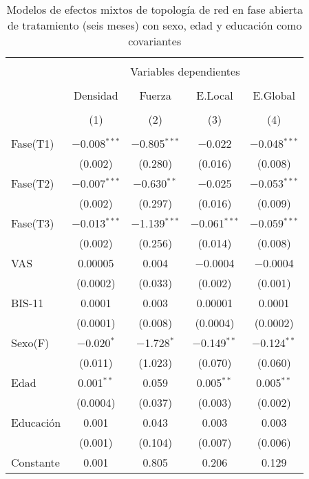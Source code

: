 \begin{table}[!htbp] \centering
    \small
  \caption{Modelos de efectos mixtos de topología de red en fase abierta de tratamiento (seis meses) con sexo, edad y educación como covariantes}
  \label{tab:memL2}
\begin{tabular}{@{\extracolsep{5pt}}lcccc}
\\[-1.8ex]\hline
\hline \\[-1.8ex]
 & \multicolumn{4}{c}{Variables dependientes} \\
\cline{2-5}
\\[-1.8ex] & Densidad & Fuerza & E.Local & E.Global \\
\\[-1.8ex] & (1) & (2) & (3) & (4)\\
\hline \\[-1.8ex]
 Fase(T1) & $-$0.008$^{***}$ & $-$0.805$^{***}$ & $-$0.022 & $-$0.048$^{***}$ \\
  & (0.002) & (0.280) & (0.016) & (0.008) \\
  Fase(T2) & $-$0.007$^{***}$ & $-$0.630$^{**}$ & $-$0.025 & $-$0.053$^{***}$ \\
  & (0.002) & (0.297) & (0.016) & (0.009) \\
  Fase(T3) & $-$0.013$^{***}$ & $-$1.139$^{***}$ & $-$0.061$^{***}$ & $-$0.059$^{***}$ \\
  & (0.002) & (0.256) & (0.014) & (0.008) \\
  VAS & 0.00005 & 0.004 & $-$0.0004 & $-$0.0004 \\
  & (0.0002) & (0.033) & (0.002) & (0.001) \\
  BIS-11 & 0.0001 & 0.003 & 0.00001 & 0.0001 \\
  & (0.0001) & (0.008) & (0.0004) & (0.0002) \\
  Sexo(F) & $-$0.020$^{*}$ & $-$1.728$^{*}$ & $-$0.149$^{**}$ & $-$0.124$^{**}$ \\
  & (0.011) & (1.023) & (0.070) & (0.060) \\
  Edad & 0.001$^{**}$ & 0.059 & 0.005$^{**}$ & 0.005$^{**}$ \\
  & (0.0004) & (0.037) & (0.003) & (0.002) \\
  Educación & 0.001 & 0.043 & 0.003 & 0.003 \\
  & (0.001) & (0.104) & (0.007) & (0.006) \\
  Constante & 0.001 & 0.805 & 0.206 & 0.129 \\

\end{tabular}
\end{table}
